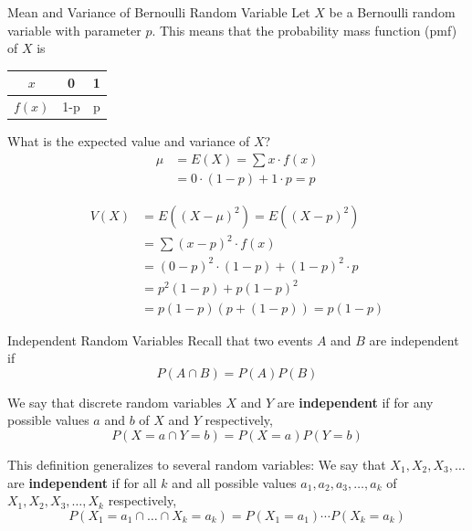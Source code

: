 \documentclass[xcolor=table]{beamer}
\renewcommand{\emph}{\textbf}
\begin{document}
\begin{frame}{Mean and Variance of Bernoulli Random Variable}
Let $X$ be a Bernoulli random variable with parameter $p$. This means that the probability mass function (pmf) of $X$ is
\begin{center}
\begin{tabular}{c||c|c}
$x$ & 0 & 1 \\ \hline
$f(x)$ & 1-p & p
\end{tabular}
\end{center}
What is the expected value and variance of $X$?
\pause 
\begin{align*}
\mu &= E(X) = \sum x\cdot f(x) \\
&= 0\cdot (1-p) + 1\cdot p = p
\end{align*}

\vspace{-.5cm}
\pause
\begin{align*}
V(X) &= E((X-\mu)^2) = E((X-p)^2)\\
&= \sum (x-p)^2\cdot f(x)\\
&=(0-p)^2\cdot (1-p) + (1-p)^2\cdot p \\
&= p^2(1-p)+p(1-p)^2 \\
&= p(1-p)(p+(1-p)) = p(1-p)
\end{align*}
\end{frame}



\begin{frame}{Independent Random Variables}
Recall that two events $A$ and $B$ are independent if
$$P(A \cap B)=P(A)P(B)$$

\pause \begin{definition}
We say that discrete random variables $X$ and $Y$ are \emph{independent} if for any possible values $a$ and $b$ of $X$ and $Y$ respectively,
$$P(X=a \cap Y=b)=P(X=a)P(Y=b)$$
\end{definition}
\pause This definition generalizes to several random variables: We say that $X_1, X_2, X_3, \dots$ are \emph{independent} if for all $k$ and all possible values $a_1, a_2, a_3,\dots,a_k$ of $X_1, X_2, X_3, \dots,X_k$ respectively,
$$P(X_1=a_1 \cap \dots \cap X_k=a_k)=
P(X_1=a_1)\cdots P(X_k=a_k)$$
\end{frame}
\end{document}
